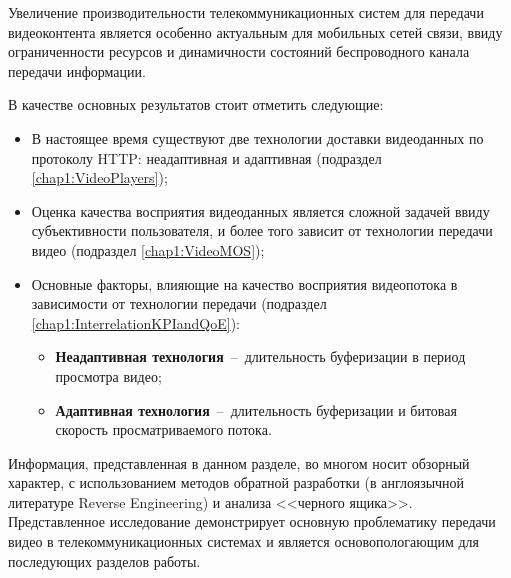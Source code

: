 Увеличение производительности телекоммуникационных систем для передачи видеоконтента является особенно актуальным для мобильных сетей связи, ввиду ограниченности ресурсов и динамичности состояний беспроводного канала передачи информации.

В качестве основных результатов стоит отметить следующие:
\begin{itemize}
	\item В настоящее время существуют две технологии доставки видеоданных по протоколу HTTP: неадаптивная и адаптивная (подраздел \ref{chap1:VideoPlayers});
	\item Оценка качества восприятия видеоданных является сложной задачей ввиду субъективности пользователя, и более того зависит от технологии передачи видео (подраздел \ref{chap1:VideoMOS});
	\item Основные факторы, влияющие на качество восприятия видеопотока в зависимости от технологии передачи (подраздел \ref{chap1:InterrelationKPIandQoE}):
		\begin{itemize}
			\item \textbf{Неадаптивная технология}~--~длительность буферизации в период просмотра видео;
			\item \textbf{Адаптивная технология}~--~длительность буферизации и битовая скорость просматриваемого потока.
		\end{itemize}
\end{itemize}

Информация, представленная в данном разделе, во многом носит обзорный характер, с использованием методов обратной разработки (в англоязычной литературе Reverse Engineering) и анализа <<черного ящика>>. Представленное исследование демонстрирует основную проблематику передачи видео в телекоммуникационных системах и является основопологающим для последующих разделов работы.